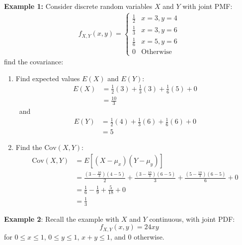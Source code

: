 \documentclass[10pt,a4paper]{article}
\begin{document}
\textbf{Example 1:} Consider discrete random variables $X$ and $Y$ with joint PMF:
\begin{align*}
    f_{X,Y}(x,y) = 
    \begin{cases}
        \frac{1}{2} & x=3, y=4 \\
        \frac{1}{3} & x=3, y=6 \\
        \frac{1}{6} & x=5, y=6 \\
        0 & \text{Otherwise}
    \end{cases}
\end{align*}
find the covariance:
\begin{enumerate}
    \item Find expected values $E(X)$ and $E(Y)$:
    \begin{align*}
        E(X) &= \frac{1}{2}(3) + \frac{1}{3}(3) + \frac{1}{6}(5) + 0 \\
        &= \frac{10}{3}
    \end{align*}\
    and 
    \begin{align*}
        E(Y) &= \frac{1}{2}(4) + \frac{1}{3}(6) + \frac{1}{6}(6) + 0 \\
        &= 5
    \end{align*}
    \item Find the $\text{Cov}(X,Y)$:
    \begin{align*}
        \text{Cov}(X,Y) &= E[(X-\mu_x)(Y-\mu_y)] \\
        &= \frac{\left(3-\frac{10}{3}\right)(4-5)}{2} + \frac{\left(3-\frac{10}{3}\right)(6-5)}{3} + \frac{\left(5-\frac{10}{3}\right)(6-5)}{6} + 0 \\
        &= \frac{1}{6} - \frac{1}{9} + \frac{5}{18} + 0 \\
        &= \frac{1}{3}
    \end{align*}
\end{enumerate}

\textbf{Example 2}: Recall the example with $X$ and $Y$ continuous, with joint PDF:
$$
f_{X,Y}(x,y) = 24xy
$$
for $0 \leq x \leq 1$, $0 \leq y \leq 1$, $ x + y \leq 1$, and $0$ otherwise.
\end{document}
